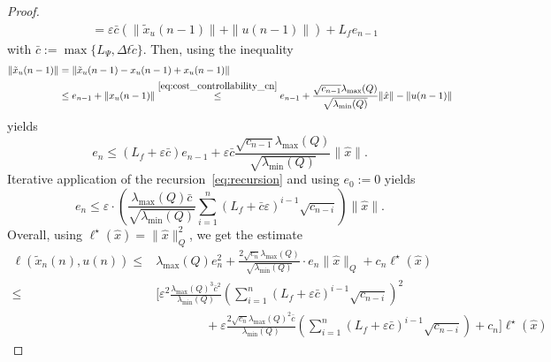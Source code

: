\documentclass{article}
\numberwithin{equation}{section}
\begin{document}
\begin{proof}
\begin{align*}
		& = \varepsilon \bar{c} \left(\| \tilde{x}_u(n-1) \| + \| u(n-1) \| \right) + L_f e_{n-1}
		\end{align*}
		with $\bar{c} := \max \{ L_\Psi, \Delta t \tilde{c} \}$.
		Then, using the inequality
		\begin{align*}
		\| \tilde{x}_u(n-1) \| & = \| \tilde{x}_u(n-1) - x_u(n-1) + x_u(n-1) \| \\
		& \leq e_{n-1} + \| x_u(n-1) \| \stackrel{\eqref{eq:cost_controllability_cn}}{\leq} e_{n-1} + \frac {\sqrt{c_{n-1}} \lambda_{\max}(Q)}{\sqrt{\lambda_{\min}(Q)}} \| \hat{x} \| - \| u(n-1) \|
		\end{align*}
		yields
		\begin{equation}\label{eq:recursion}
		e_n \leq (L_f + \varepsilon \bar{c} ) e_{n-1} + \varepsilon \bar{c} \frac {\sqrt{c_{n-1}} \lambda_{\max}(Q)}{\sqrt{\lambda_{\min}(Q)}} \| \hat{x} \|.
		\end{equation}
		Iterative application of the recursion~\eqref{eq:recursion} and using $e_0 := 0$ yields
		\begin{equation}\nonumber
		e_n \leq \varepsilon \cdot \left( \frac { \lambda_{\max}(Q) \bar{c} }{\sqrt{\lambda_{\min}(Q)}} \sum_{i=1}^n (L_f + \bar{c} \varepsilon)^{i-1} \sqrt{c_{n-i}} \right) \| \hat{x} \|.
		\end{equation}
		Overall, using $\ell^\star(\hat{x}) = \| \hat{x} \|^2_Q$, we get the estimate
		\begin{align*}
		\ell(\tilde{x}_n(n), u(n))
		\leq & \lambda_{\max}(Q) e_n^2 + \frac {2\sqrt{c_n} \lambda_{\max}(Q)}{\sqrt{\lambda_{\min}(Q)}} \cdot e_n \| \hat{x} \|_Q + c_n \ell^\star(\hat{x}) \\
		\leq & \bigg[ \varepsilon^2 \frac { \lambda_{\max}(Q)^3 \bar{c}^2}{{\lambda_{\min}(Q)}} \left( \sum_{i=1}^n (L_f + \varepsilon \bar{c})^{i-1} \sqrt{c_{n-i}} \right)^2 
		\\ 
		& \qquad \qquad+ \varepsilon \frac {2\sqrt{c_n} \lambda_{\max}(Q)^2 \bar{c}}{\lambda_{\min}(Q)} \left( \sum_{i=1}^n (L_f + \varepsilon \bar{c})^{i-1} \sqrt{c_{n-i}} \right) + c_n \bigg] \ell^\star(\hat{x})

\end{align*}
\end{proof}
\end{document}
